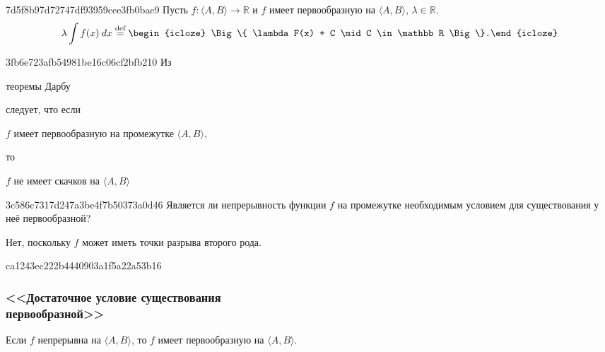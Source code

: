 \begin{note}{7d5f8b97d72747df93959cee3fb0bae9}
    Пусть \( f : \langle A, B \rangle \to \mathbb R \) и \( f \) имеет первообразную на \( \langle A, B \rangle \), \( \lambda \in \mathbb R \).
    \[
        \lambda \int f(x)\: dx \overset{\text{def}}= \begin{icloze}{1}\Big\{ \lambda F(x) + C \mid C \in \mathbb R \Big\}.\end{icloze}
    \]
\end{note}

\begin{note}{3fb6e723afb54981be16c06cf2bfb210}
    Из \begin{icloze}{3}теоремы Дарбу\end{icloze} следует, что
    если \begin{icloze}{2}\( f \) имеет первообразную на промежутке \( \langle A, B \rangle \),\end{icloze}
    то \begin{icloze}{1}\( f \) не имеет скачков на \( \langle A, B \rangle \)\end{icloze}
\end{note}

\begin{note}{3c586c7317d247a3be4f7b50373a0d46}
    Является ли непрерывность функции \( f \) на промежутке необходимым условием для существования у неё первообразной?

    \begin{cloze}{1}
        Нет, поскольку \( f \) может иметь точки разрыва второго рода.
    \end{cloze}
\end{note}

\begin{note}{ca1243ec222b4440903a1f5a22a53b16}
    \subsubsection{<<Достаточное условие существования \\\phantom{<<}первообразной>>}
    \begin{icloze}{1}Если \( f \) непрерывна на \( \langle A, B \rangle \), то \( f \) имеет первообразную на \( \langle A, B \rangle \).\end{icloze}
\end{note}

